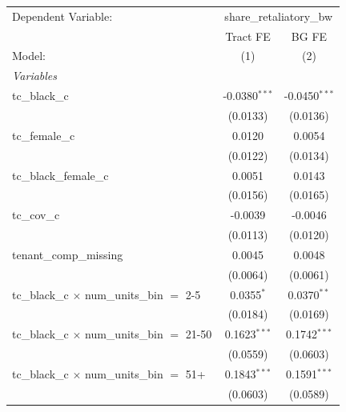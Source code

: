\begin{tabular}{lcc}
   \tabularnewline \midrule \midrule
   Dependent Variable: & \multicolumn{2}{c}{share\_retaliatory\_bw}\\
                                                         & Tract FE        & BG FE \\   
   Model:                                                & (1)             & (2)\\  
   \midrule
   \emph{Variables}\\
   tc\_black\_c                                          & -0.0380$^{***}$ & -0.0450$^{***}$\\   
                                                         & (0.0133)        & (0.0136)\\   
   tc\_female\_c                                         & 0.0120          & 0.0054\\   
                                                         & (0.0122)        & (0.0134)\\   
   tc\_black\_female\_c                                  & 0.0051          & 0.0143\\   
                                                         & (0.0156)        & (0.0165)\\   
   tc\_cov\_c                                            & -0.0039         & -0.0046\\   
                                                         & (0.0113)        & (0.0120)\\   
   tenant\_comp\_missing                                 & 0.0045          & 0.0048\\   
                                                         & (0.0064)        & (0.0061)\\   
   tc\_black\_c $\times$ num\_units\_bin $=$ 2-5         & 0.0355$^{*}$    & 0.0370$^{**}$\\   
                                                         & (0.0184)        & (0.0169)\\   
   tc\_black\_c $\times$ num\_units\_bin $=$ 21-50       & 0.1623$^{***}$  & 0.1742$^{***}$\\   
                                                         & (0.0559)        & (0.0603)\\   
   tc\_black\_c $\times$ num\_units\_bin $=$ 51+         & 0.1843$^{***}$  & 0.1591$^{***}$\\   
                                                         & (0.0603)        & (0.0589)\\   

\end{tabular}
